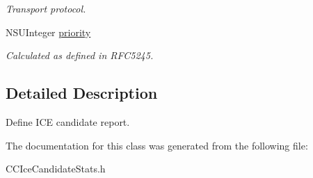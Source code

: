 \begin{DoxyCompactItemize}
\begin{DoxyCompactList}\small\item\em Transport protocol. \end{DoxyCompactList}\item 
\mbox{\label{interface_c_c_ice_candidate_stats_acb00a08683acb132a56ffe6144a72c9f}} 
N\+S\+U\+Integer \hyperlink{interface_c_c_ice_candidate_stats_acb00a08683acb132a56ffe6144a72c9f}{priority}
\begin{DoxyCompactList}\small\item\em Calculated as defined in R\+F\+C5245. \end{DoxyCompactList}\end{DoxyCompactItemize}


\subsection{Detailed Description}
Define I\+CE candidate report. 

The documentation for this class was generated from the following file\+:\begin{DoxyCompactItemize}
\item 
C\+C\+Ice\+Candidate\+Stats.\+h\end{DoxyCompactItemize}

